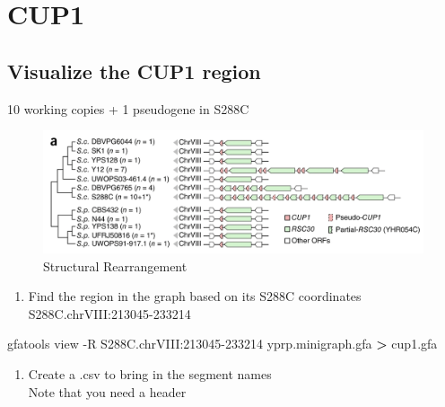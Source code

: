 \documentclass[
]{book}
\newenvironment{Shaded}{\begin{snugshade}}{\end{snugshade}}
\newcommand{\AttributeTok}[1]{\textcolor[rgb]{0.77,0.63,0.00}{#1}}
\newcommand{\ExtensionTok}[1]{#1}
\newcommand{\NormalTok}[1]{#1}
\newcommand{\OperatorTok}[1]{\textcolor[rgb]{0.81,0.36,0.00}{\textbf{#1}}}
\providecommand{\tightlist}{%
  \setlength{\itemsep}{0pt}\setlength{\parskip}{0pt}}
\begin{document}
\hypertarget{cup1}{%
\section{CUP1}\label{cup1}}

\hypertarget{visualize-the-cup1-region}{%
\subsection*{Visualize the CUP1 region}\label{visualize-the-cup1-region}}

10 working copies + 1 pseudogene in S288C

\begin{figure}
\centering
\includegraphics[width=1\textwidth,height=\textheight]{./Figures/StructuralRearrangements.png}
\caption{Structural Rearrangement}
\end{figure}

\begin{enumerate}
\def\labelenumi{\arabic{enumi}.}
\tightlist
\item
  Find the region in the graph based on its S288C coordinates\\
  S288C.chrVIII:213045-233214
\end{enumerate}

\begin{Shaded}
\begin{Highlighting}[]
\ExtensionTok{gfatools}\NormalTok{ view }\AttributeTok{{-}R}\NormalTok{ S288C.chrVIII:213045{-}233214 yprp.minigraph.gfa }\OperatorTok{\textgreater{}}\NormalTok{ cup1.gfa}
\end{Highlighting}
\end{Shaded}

\begin{enumerate}
\def\labelenumi{\arabic{enumi}.}
\setcounter{enumi}{1}
\tightlist
\item
  Create a .csv to bring in the segment names\\
  Note that you need a header
\end{enumerate}
\end{document}
